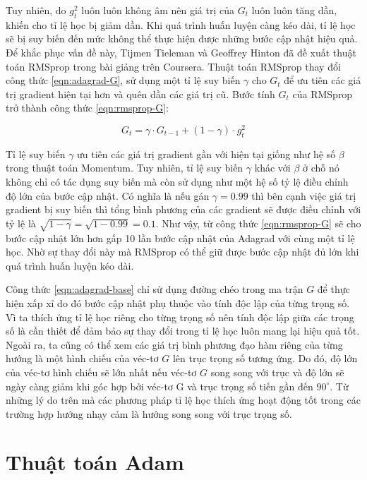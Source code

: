 Tuy nhiên, do $g^{2}_{t}$ luôn luôn không âm nên giá trị của $G_t$ luôn luôn tăng dần, khiến cho tỉ lệ học bị giảm dần. Khi quá trình huấn luyện càng kéo dài, tỉ lệ học sẽ bị suy biến đến mức không thể thực hiện được những bước cập nhật hiệu quả. Để khắc phục vấn đề này, Tijmen Tieleman và Geoffrey Hinton đã đề xuất thuật toán RMSprop trong bài giảng trên Coursera\cite{tieleman2012rmsprop}. Thuật toán RMSprop thay đổi công thức \ref{eqn:adagrad-G}, sử dụng một tỉ lệ suy biến $\gamma$ cho $G_t$ để ưu tiên các giá trị gradient hiện tại hơn và quên dần các giá trị cũ. Bước tính $G_t$ của RMSprop trở thành công thức \ref{eqn:rmsprop-G}:

\begin{equation}
	\label{eqn:rmsprop-G}
	G_{t} = \gamma \cdot G_{t-1} + (1-\gamma) \cdot g^{2}_t
\end{equation}

Tỉ lệ suy biến $\gamma$ ưu tiên các giá trị gradient gần với hiện tại giống như hệ số $\beta$ trong thuật toán Momentum. Tuy nhiên, tỉ lệ suy biến $\gamma$ khác với $\beta$ ở chỗ nó không chỉ có tác dụng suy biến mà còn sử dụng như một hệ số tỷ lệ điều chỉnh độ lớn của bước cập nhật. Có nghĩa là nếu gán $\gamma = 0.99$ thì bên cạnh việc giá trị gradient bị suy biến thì tổng bình phương của các gradient sẽ được điều chỉnh với tỷ lệ là $\sqrt{1-\gamma} = \sqrt{1 - 0.99} = 0.1$. Như vậy, từ công thức \ref{eqn:rmsprop-G} sẽ cho bước cập nhật lớn hơn gấp 10 lần bước cập nhật của Adagrad với cùng một tỉ lệ học. Nhờ sự thay đổi này mà RMSprop có thể giữ được bước cập nhật đủ lớn khi quá trình huấn luyện kéo dài.

Công thức \ref{eqn:adagrad-base} chỉ sử dụng đường chéo trong ma trận $G$ để thực hiện xấp xỉ do đó bước cập nhật phụ thuộc vào tính độc lập của từng trọng số. Vì ta thích ứng tỉ lệ học riêng cho từng trọng số nên tính độc lập giữa các trọng số là cần thiết để đảm bảo sự thay đổi trong tỉ lệ học luôn mang lại hiệu quả tốt. Ngoài ra, ta cũng có thể xem các giá trị bình phương đạo hàm riêng của từng hướng là một hình chiếu của véc-tơ $G$ lên trục trọng số tương ứng. Do đó, độ lớn của véc-tơ hình chiếu sẽ lớn nhất nếu véc-tơ $G$ song song với trục và độ lớn sẽ ngày càng giảm khi góc hợp bởi véc-tơ G và trục trọng số tiến gần đến $90^\circ$. Từ những lý do trên mà các phương pháp tỉ lệ học thích ứng hoạt động tốt trong các trường hợp hướng nhạy cảm là hướng song song với trục trọng số.

\section{Thuật toán Adam}

